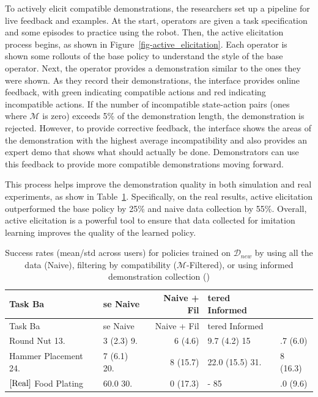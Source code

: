 \documentclass[
  letterpaper,
  numbers=noenddot,
  DIV=11]{scrreprt}
\theoremstyle{plain}
\theoremstyle{definition}
\theoremstyle{remark}
\begin{document}
To actively elicit compatible demonstrations, the researchers set up a
pipeline for live feedback and examples. At the start, operators are
given a task specification and some episodes to practice using the
robot. Then, the active elicitation process begins, as shown in
Figure~\ref{fig-active_elicitation}. Each operator is shown some
rollouts of the base policy to understand the style of the base
operator. Next, the operator provides a demonstration similar to the
ones they were shown. As they record their demonstrations, the interface
provides online feedback, with green indicating compatible actions and
red indicating incompatible actions. If the number of incompatible
state-action pairs (ones where \(\mathcal{M}\) is zero) exceeds 5\% of
the demonstration length, the demonstration is rejected. However, to
provide corrective feedback, the interface shows the areas of the
demonstration with the highest average incompatibility and also provides
an expert demo that shows what should actually be done. Demonstrators
can use this feedback to provide more compatible demonstrations moving
forward.

This process helps improve the demonstration quality in both simulation
and real experiments, as show in
Table~\ref{tbl-active_elicitation_results}. Specifically, on the real
results, active elicitation outperformed the base policy by 25\% and
naive data collection by 55\%. Overall, active elicitation is a powerful
tool to ensure that data collected for imitation learning improves the
quality of the learned policy.

\begin{longtable}[]{@{}llrll@{}}
\caption{Success rates (mean/std across users) for policies trained on
\(\mathcal{D}_{new}\) by using all the data (Naive), filtering by
compatibility (\(\mathcal{M}\)-Filtered), or using informed
demonstration collection ()}\label{tbl-active_elicitation_results}\tabularnewline
\toprule\noalign{}
Task Ba & se Naive & Naive + Fil & tered Informed & \\
\midrule\noalign{}
\endfirsthead
\toprule\noalign{}
Task Ba & se Naive & Naive + Fil & tered Informed & \\
\midrule\noalign{}
\endhead
\bottomrule\noalign{}
\endlastfoot
Round Nut 13. & 3 (2.3) 9. & 6 (4.6) & 9.7 (4.2) 15 & .7 (6.0) \\
Hammer Placement 24. & 7 (6.1) 20. & 8 (15.7) & 22.0 (15.5) 31. & 8
(16.3) \\
\(\left[ \textup{Real} \right]\) Food Plating & 60.0 30. & 0 (17.3) & -
85 & .0 (9.6) \\
\end{longtable}
\end{document}
